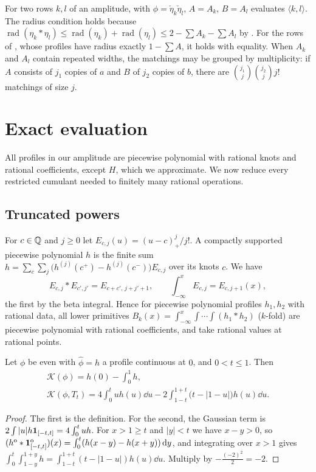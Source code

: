 \documentclass[11pt,colorlinks]{charlie}
\newcommand{\rad}{\operatorname{rad}}
\newcommand{\Ka}{\mathcal{K}}
\newcommand{\ho}[1]{#1^{\mathrm{o}}}
\begin{document}
For two rows $k,l$ of an amplitude,  with $\phi=\check\eta_k\check\eta_l$, $A=A_k$, $B=A_l$ evaluates $\langle k,l\rangle$. The radius condition holds because $\rad(\eta_k*\eta_l)\le\rad(\eta_k)+\rad(\eta_l)\le2-\sum A_k-\sum A_l$ by . For the rows of , whose profiles have radius exactly $1-\sum A$, it holds with equality. When $A_k$ and $A_l$ contain repeated widths, the matchings may be grouped by multiplicity: if $A$ consists of $j_1$ copies of $a$ and $B$ of $j_2$ copies of $b$, there are $\binom{j_1}j\binom{j_2}jj!$ matchings of size $j$.

\section{Exact evaluation}\label{sec:exact}
All profiles in our amplitude are piecewise polynomial with rational knots and rational coefficients, except $H$, which we approximate. We now reduce every restricted cumulant needed to finitely many rational operations.

\subsection{Truncated powers}
For $c\in\mathbb{Q}$ and $j\ge0$ let $E_{c,j}(u)=(u-c)_+^j/j!$. A compactly supported piecewise polynomial $h$ is the finite sum $h=\sum_c\sum_{j}\big(h^{(j)}(c^+)-h^{(j)}(c^-)\big)E_{c,j}$ over its knots $c$. We have
\[
 E_{c,j}*E_{c',j'}=E_{c+c',\,j+j'+1},\qquad\int_{-\infty}^xE_{c,j}=E_{c,j+1}(x),
\]
the first by the beta integral. Hence for piecewise polynomial profiles $h_1,h_2$ with rational data, all lower primitives $B_k(x)=\int_{-\infty}^x\int\cdots\int(h_1*h_2)$ ($k$-fold) are piecewise polynomial with rational coefficients, and take rational values at rational points.

\begin{lemma}\label{lem:mean-cov}
Let $\phi$ be even with $\widehat\phi=h$ a profile continuous at $0$, and $0<t\le1$. Then
\begin{gather*}
 \Ka(\phi)=h(0)-\int_0^1h,\\
 \Ka(\phi,T_t)=4\int_0^tuh(u)\dd u-2\int_{1-t}^{1+t}\big(t-|1-u|\big)h(u)\dd u .
\end{gather*}
\end{lemma}
\begin{proof}
The first is the definition. For the second, the Gaussian term is $2\int|u|h\mathbf{1}_{[-t,t]}=4\int_0^tuh$. For $x>1\ge t$ and $|y|<t$ we have $x-y>0$, so $(\ho h*\ho{\one_{[-t,t]}})(x)=\int_0^t(h(x-y)-h(x+y))\dd y$, and integrating over $x>1$ gives $\int_0^t\int_{1-y}^{1+y}h=\int_{1-t}^{1+t}(t-|1-u|)h(u)\dd u$. Multiply by $-\frac{(-2)^2}2=-2$.
\end{proof}
\end{document}
